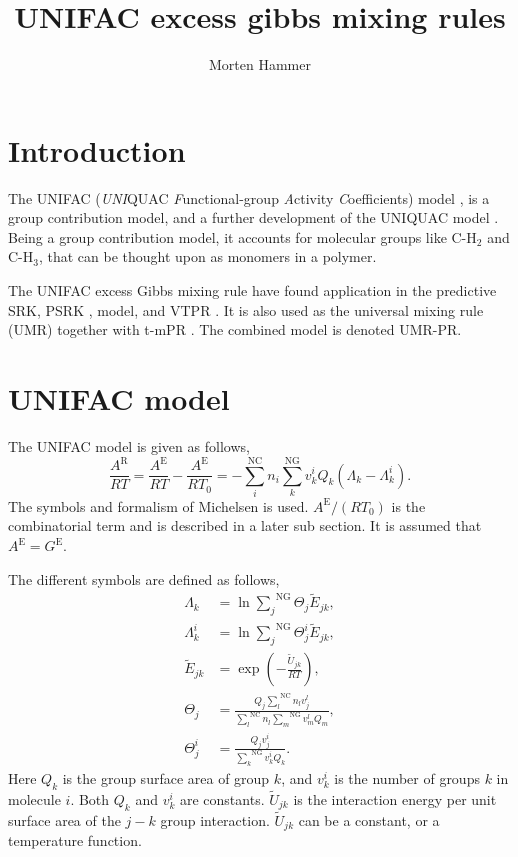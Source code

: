 \documentclass[english]{../thermomemo/thermomemo}
\title{UNIFAC excess gibbs mixing rules}
\author{Morten Hammer}
\newcommand*{\ousum}[2]{\overset{#1}{\underset{#2}{\sum}}}
\newcommand{\excess}{\text{E}\xspace}
\newcommand{\NC}{\text{NC}\xspace}
\newcommand{\NGr}{\text{NG}\xspace}
\newcommand{\res}{\text{R}\xspace}
\begin{document}
\frontmatter
\tableofcontents
\section{Introduction}
The UNIFAC (\textit{UNI}QUAC \textit{F}unctional-group \textit{A}ctivity
\textit{C}oefficients) model \cite{Fredenslund1975}, is a group
contribution model, and a further development of the UNIQUAC model
\cite{Abrams1975}. Being a group contribution model, it accounts for
molecular groups like $\text{C-H}_2$ and $\text{C-H}_3$,
that can be thought upon as monomers in a polymer.

The UNIFAC excess Gibbs mixing rule have found application in the
predictive SRK, PSRK \cite{Holderbaum1991}, model, and VTPR
\cite{Collinet2006}. It is also used as the universal mixing rule
(UMR) \cite{Voutsas2004} together with t-mPR
\cite{Magoulas1990,Avlonitis1994}. The combined model is denoted
UMR-PR.

\section{UNIFAC model}
The UNIFAC model \cite{Fredenslund1975} is given as follows,
\begin{equation}
  \frac{A^\res}{RT} = \frac{A^\excess}{RT} - \frac{A^\excess}{RT_0} = - \ousum{\NC}{i} n_i \ousum{\NGr}{k}  v_k^i Q_k(\Lambda_k - \Lambda_k^i).
  \label{eq:Ae}
\end{equation}
The symbols and formalism of Michelsen \cite{Michelsen2007} is
used. $A^\excess/(RT_0)$ is the combinatorial term and is described in
a later sub section. It is assumed that $A^\excess = G^\excess$.

The different symbols are defined as follows,
\begin{align}
  \Lambda_k &= \ln \ousum{\NGr}{j}  \Theta_j \tilde{E}_{jk},\label{eq:Lambda_k}\\
  \Lambda_k^i &= \ln \ousum{\NGr}{j}  \Theta_j^i \tilde{E}_{jk}, \label{eq:Lambda_ki}\\
  \tilde{E}_{jk} &= \exp \left(-\frac{\tilde{U}_{jk}}{RT}\right), \label{eq:E_jk}\\
  \Theta_j &= \frac{Q_j \ousum{\NC}{l}n_lv_j^l}{\ousum{\NC}{l}n_l\ousum{\NGr}{m}v_m^lQ_m}, \label{eq:Theta_j}\\
  \Theta_j^i &= \frac{Q_j v_j^i}{\ousum{\NGr}{k}v_k^iQ_k}. \label{eq:Theta_ji}
\end{align}
Here $Q_k$ is the group surface area of group $k$, and $v_k^i$ is the
number of groups $k$ in molecule $i$. Both $Q_k$ and $v_k^i$ are
constants. $\tilde{U}_{jk}$ is the interaction energy per unit surface
area of the $j-k$ group interaction. $\tilde{U}_{jk}$ can be a
constant, or a temperature function.
\end{document}
